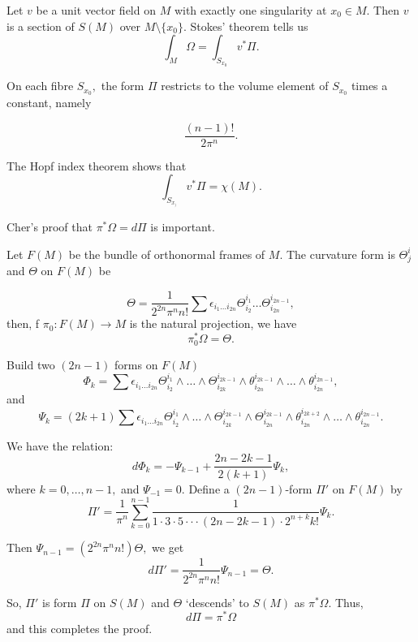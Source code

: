 Let $v$ be a unit vector field on $M$ with exactly one singularity at $x_0\in M.$
Then $v$ is a section of $S(M)$ over $M\setminus \{x_0\}.$
Stokes' theorem tells us
$$\int_M\Omega=\int_{S_{x_0}}v^*\Pi.$$

On each fibre $S_{x_0},$ the form $\Pi$ restricts to the volume element of $S_{x_0}$
times a constant, namely

$$\frac{(n-1)!}{2\pi^n}.$$

The Hopf index theorem shows that
$$\int_{S_{x_)}}v^*\Pi=\chi(M).$$ 

Cher's proof that $\pi^*\Omega=d\Pi$ is important.

Let $F(M)$ be the bundle of orthonormal frames of $M$.
The curvature form is $\Theta_j^i$ and $\Theta$ on $F(M)$
be

$$\Theta=\frac{1}{2^{2n}\pi^n n!}\sum \epsilon_{i_1\ldots i_{2n}}\Theta_{i_2}^{i_1}\ldots \Theta_{i_{2n}}^{i_{2n-1}},$$
then, f $\pi_0:F(M)\rightarrow M$ is the natural projection, we have
$$\pi_0^*\Omega =\Theta.$$

Build two $(2n-1)$ forms on $F(M)$
$$\Phi_k=\sum \epsilon_{i_1\ldots i_{2n}} \Theta_{i_2}^{i_1}\land \ldots\land \Theta_{i_{2k}}^{i_{2k-1}}\land \theta_{i_{2n}}^{i_{2k-1}}\land \ldots \land \theta_{i_{2n}}^{i_{2n-1}},$$
and
$$\Psi_k=(2k+1)\sum \epsilon_{i_1\ldots i_{2n}} \Theta_{i_2}^{i_1}\land \ldots\land \Theta_{i_{2k}}^{i_{2k-1}}\land \Theta_{i_{2n}}^{i_{2k-1}}\land \theta_{i_{2n}}^{i_{2k+2}}\land \ldots \land \theta_{i_{2n}}^{i_{2n-1}}.$$

We have the relation:
$$d\Phi_k=-\Psi_{k-1}+\frac{2n-2k-1}{2(k+1)}\Psi_k,$$
where $k=0,\ldots, n-1,$ and $\Psi_{-1}=0.$
Define a $(2n-1)$-form $\Pi'$ on $F(M)$ by
$$\Pi'=\frac{1}{\pi^n}\sum_{k=0}^{n-1}\frac{1}{1\cdot 3\cdot 5\cdot \cdot \cdot (2n-2k-1)\cdot 2^{n+k}k!}\Psi_k.$$

Then $\Psi_{n-1}=(2^{2n}\pi^n n!)\Theta,$ we get
$$d\Pi'=\frac{1}{2^{2n}\pi^n n!}\Psi_{n-1}=\Theta.$$

So, $\Pi'$ is form $\Pi$ on $S(M)$ and $\Theta$ `descends' to $S(M)$ as $\pi^*\Omega.$
Thus,
$$d\Pi=\pi^*\Omega$$
and this completes the proof.
